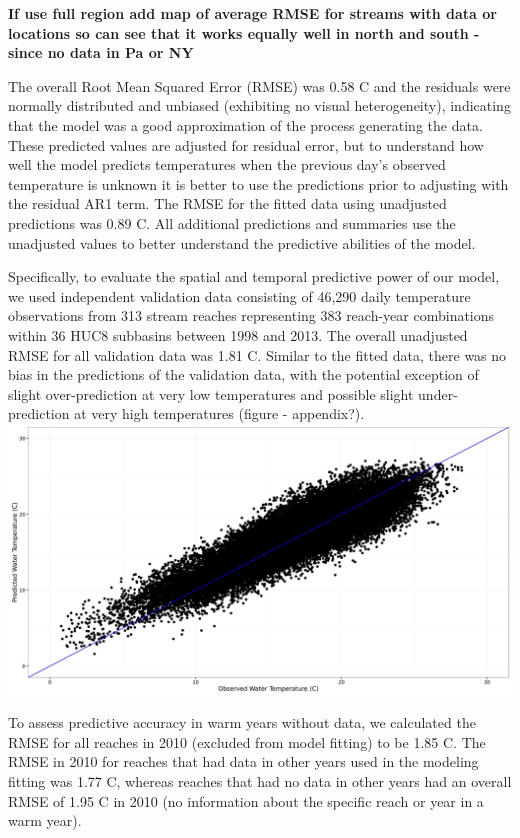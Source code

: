 \documentclass[]{article}
\begin{document}
\textbf{If use full region add map of average RMSE for streams with data
or locations so can see that it works equally well in north and south -
since no data in Pa or NY}

The overall Root Mean Squared Error (RMSE) was 0.58 C and the residuals
were normally distributed and unbiased (exhibiting no visual
heterogeneity), indicating that the model was a good approximation of
the process generating the data. These predicted values are adjusted for
residual error, but to understand how well the model predicts
temperatures when the previous day's observed temperature is unknown it
is better to use the predictions prior to adjusting with the residual
AR1 term. The RMSE for the fitted data using unadjusted predictions was
0.89 C. All additional predictions and summaries use the unadjusted
values to better understand the predictive abilities of the model.

Specifically, to evaluate the spatial and temporal predictive power of
our model, we used independent validation data consisting of 46,290
daily temperature observations from 313 stream reaches representing 383
reach-year combinations within 36 HUC8 subbasins between 1998 and 2013.
The overall unadjusted RMSE for all validation data was 1.81 C. Similar
to the fitted data, there was no bias in the predictions of the
validation data, with the potential exception of slight over-prediction
at very low temperatures and possible slight under-prediction at very
high temperatures (figure - appendix?).
\includegraphics{Figures/validation_plot.jpg}

To assess predictive accuracy in warm years without data, we calculated
the RMSE for all reaches in 2010 (excluded from model fitting) to be
1.85 C. The RMSE in 2010 for reaches that had data in other years used
in the modeling fitting was 1.77 C, whereas reaches that had no data in
other years had an overall RMSE of 1.95 C in 2010 (no information about
the specific reach or year in a warm year).
\end{document}
